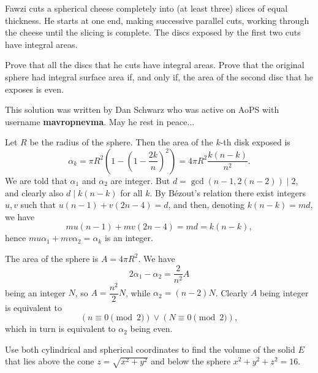 \documentclass[12pt,a4paper]{memoir}
\theoremstyle{definition}
\begin{document}
\begin{question}[name={2012 Gulf Math Olympiad}]
	Fawzi cuts a spherical cheese completely into (at least three) slices of equal thickness. He starts at one end, making successive parallel cuts, working through the cheese until the slicing is complete. The discs exposed by the first two cuts have integral areas.
	\begin{tasks}
		\task Prove that all the discs that he cuts have integral areas.
		\task Prove that the original sphere had integral surface area if, and only if, the area of the second disc that he exposes is even.
	\end{tasks}
\end{question}





\begin{solution}[name={Solution by Mavropnevma}] 
	This solution was written by Dan Schwarz who was active on AoPS with username \textbf{mavropnevma}. May he rest in peace...
	\begin{tasks}
		\task Let $R$ be the radius of the sphere. Then the area of the $k$-th disk exposed is $$\alpha_k = \pi R^2 \left (1 - \left ( 1 - \frac {2k} {n}\right )^2\right ) = 4\pi R^2 \frac {k(n-k)} {n^2}.$$ We are told that $\alpha_1$ and $\alpha_2$ are integer. But $d = \gcd(n-1, 2(n-2)) \mid 2$, and clearly also $d\mid k(n-k)$ for all $k$. By Bézout's relation there exist integers $u,v$ such that $u(n-1) + v(2n-4) = d$, and then, denoting $k(n-k) = md$, we have $$mu(n-1) + mv(2n-4) = md = k(n-k),$$ hence $mu\alpha_1 + mv\alpha_2 = \alpha_k$ is an integer.
		
		\task The area of the sphere is $A = 4\pi R^2$. We have $$2\alpha_1 - \alpha_2 =  \dfrac {2} {n^2} A$$ being an integer $N$, so $A = \dfrac {n^2} {2} N$, while $\alpha_2 = (n-2) N$. Clearly $A$ being integer is equivalent to $$(n\equiv 0 \pmod{2}) \lor (N\equiv 0 \pmod{2}),$$ which in turn is equivalent to $\alpha_2$ being even.
	\end{tasks}
\end{solution}





\begin{question}[name={Cylindrical and Spherical Coordinates by Mathwizarddude}]
	Use both cylindrical and spherical coordinates to find the volume of the solid $ E$ that lies above the cone $ z = \sqrt {x^2 + y^2}$ and below the sphere $ x^2 + y^2 + z^2 = 16$.
\end{question}
\end{document}
